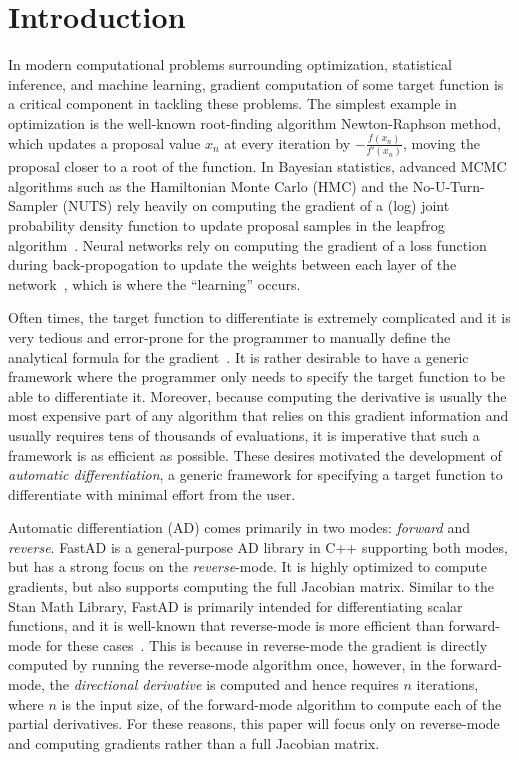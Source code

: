 \section{Introduction}

In modern computational problems surrounding optimization, statistical inference, and machine learning,
gradient computation of some target function is a critical component in tackling these problems.
The simplest example in optimization is the well-known root-finding algorithm Newton-Raphson method,
which updates a proposal value $x_n$ at every iteration by $-\frac{f(x_n)}{f'(x_n)}$,
moving the proposal closer to a root of the function.
In Bayesian statistics, advanced MCMC algorithms
such as the Hamiltonian Monte Carlo (HMC) and the No-U-Turn-Sampler (NUTS) rely
heavily on computing the gradient of a (log) joint probability density function
to update proposal samples in the leapfrog algorithm~\cite{hoffman:2011}\cite{neal:2012}.
Neural networks rely on computing 
the gradient of a loss function during back-propogation
to update the weights between each layer of the network~\cite{goodfellow:2016},
which is where the ``learning'' occurs.

Often times, the target function to differentiate is extremely complicated
and it is very tedious and error-prone for the programmer to manually define 
the analytical formula for the gradient~\cite{margossian:2018}.
It is rather desirable to have a generic framework where the programmer 
only needs to specify the target function to be able to differentiate it.
Moreover, because computing the derivative is usually the most expensive part of any algorithm
that relies on this gradient information and usually requires tens of thousands of evaluations, 
it is imperative that such a framework is as efficient as possible.
These desires motivated the development of \emph{automatic differentiation},
a generic framework for specifying a target function to differentiate with minimal effort from the user.

Automatic differentiation (AD) comes primarily in two modes: \emph{forward} and \emph{reverse}.
FastAD is a general-purpose AD library in C++ supporting both modes, but has a strong focus on the \emph{reverse}-mode.
It is highly optimized to compute gradients, but also supports computing the full Jacobian matrix.
Similar to the Stan Math Library, FastAD is primarily intended for differentiating scalar functions, 
and it is well-known that reverse-mode is more efficient than forward-mode for these cases~\cite{carpenter:2015}.
This is because in reverse-mode the gradient is directly computed by running the reverse-mode algorithm once,
however, in the forward-mode, the \emph{directional derivative} is computed and hence requires 
$n$ iterations, where $n$ is the input size, of the forward-mode algorithm to compute each of the partial derivatives.
For these reasons, this paper will focus only on reverse-mode and computing gradients rather than a full Jacobian matrix.
